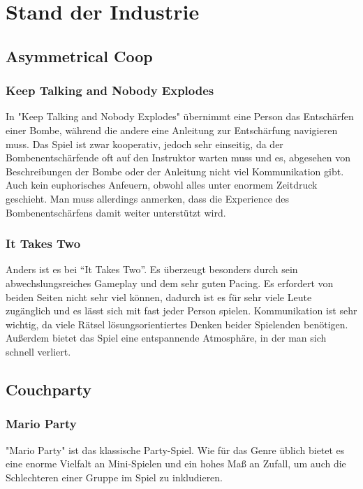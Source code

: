 \chapter{Stand der Industrie\label{_industrie}}

\section{Asymmetrical Coop}

\subsection{Keep Talking and Nobody Explodes}
In "Keep Talking and Nobody Explodes" übernimmt eine Person das Entschärfen einer Bombe, während die andere eine Anleitung zur Entschärfung navigieren muss. Das Spiel ist zwar kooperativ, jedoch sehr einseitig, da der Bombenentschärfende oft auf den Instruktor warten muss und es, abgesehen von Beschreibungen der Bombe oder der Anleitung nicht viel Kommunikation gibt. Auch kein euphorisches Anfeuern, obwohl alles unter enormem Zeitdruck geschieht. Man muss allerdings anmerken, dass die Experience des Bombenentschärfens damit weiter unterstützt wird.

\subsection{It Takes Two}
Anders ist es bei "`It Takes Two"'. Es überzeugt besonders durch sein abwechslungsreiches Gameplay und dem sehr guten Pacing. Es erfordert von beiden Seiten nicht sehr viel können, dadurch ist es für sehr viele Leute zugänglich und es lässt sich mit fast jeder Person spielen. Kommunikation ist sehr wichtig, da viele Rätsel lösungsorientiertes Denken beider Spielenden benötigen. Außerdem bietet das Spiel eine entspannende Atmosphäre, in der man sich schnell verliert.

\section{Couchparty}

\subsection{Mario Party}
"Mario Party" ist das klassische Party-Spiel. Wie für das Genre üblich bietet es eine enorme Vielfalt an Mini-Spielen und ein hohes Maß an Zufall, um auch die Schlechteren einer Gruppe im Spiel zu inkludieren.

